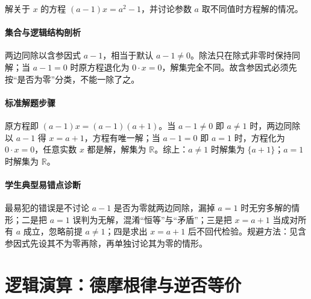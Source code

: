 \begin{problem}
解关于 $x$ 的方程 $(a-1)x=a^2-1$，并讨论参数 $a$ 取不同值时方程解的情况。
\end{problem}
\begin{solution}
\paragraph{集合与逻辑结构剖析}
两边同除以含参因式 $a-1$，相当于默认 $a-1\neq0$。除法只在除式非零时保持同解；当 $a-1=0$ 时原方程退化为 $0\cdot x=0$，解集完全不同。故含参因式必须先按“是否为零”分类，不能一除了之。
\paragraph{标准解题步骤}
原方程即 $(a-1)x=(a-1)(a+1)$。当 $a-1\neq0$ 即 $a\neq1$ 时，两边同除以 $a-1$ 得 $x=a+1$，方程有唯一解；当 $a-1=0$ 即 $a=1$ 时，方程化为 $0\cdot x=0$，任意实数 $x$ 都是解，解集为 $\mathbb{R}$。综上：$a\neq1$ 时解集为 $\{a+1\}$；$a=1$ 时解集为 $\mathbb{R}$。
\paragraph{学生典型易错点诊断}
最易犯的错误是不讨论 $a-1$ 是否为零就两边同除，漏掉 $a=1$ 时无穷多解的情形；二是把 $a=1$ 误判为无解，混淆“恒等”与“矛盾”；三是把 $x=a+1$ 当成对所有 $a$ 成立，忽略前提 $a\neq1$；四是求出 $x=a+1$ 后不回代检验。规避方法：见含参因式先设其不为零再除，再单独讨论其为零的情形。
\end{solution}

\section{逻辑演算：德摩根律与逆否等价}

